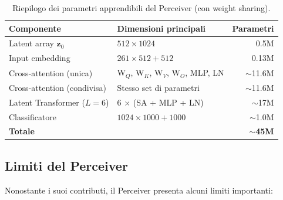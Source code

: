 \documentclass[12pt,a4paper]{article}
\begin{document}
\begin{table}[htbp]
\centering
\caption{Riepilogo dei parametri apprendibili del Perceiver (con weight sharing).}
\begin{tabular}{@{}llr@{}}
\toprule
\textbf{Componente} & \textbf{Dimensioni principali} & \textbf{Parametri} \\
\midrule
Latent array $\mathbf{z}_0$ & $512 \times 1024$ & 0.5M \\
Input embedding & $261 \times 512 + 512$ & 0.13M \\
Cross-attention (unica) & W$_Q$, W$_K$, W$_V$, W$_O$, MLP, LN & $\sim$11.6M \\
Cross-attention (condivisa) & Stesso set di parametri & $\sim$11.6M \\
Latent Transformer ($L=6$) & 6 $\times$ (SA + MLP + LN) & $\sim$17M \\
Classificatore & $1024 \times 1000 + 1000$ & $\sim$1.0M \\
\midrule
\textbf{Totale} & & $\sim$\textbf{45M} \\
\bottomrule
\end{tabular}
\end{table}


\subsection{Limiti del Perceiver} \label{sec:limiti}

Nonostante i suoi contributi, il Perceiver presenta alcuni limiti importanti:
\end{document}
